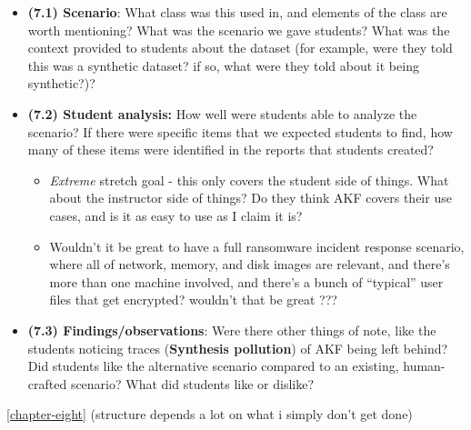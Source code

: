 \begin{itemize}
\tightlist
\item
  \textbf{(7.1) Scenario}: What class was this used in, and elements of
  the class are worth mentioning? What was the scenario we gave
  students? What was the context provided to students about the dataset
  (for example, were they told this was a synthetic dataset? if so, what
  were they told about it being synthetic?)?
\item
  \textbf{(7.2) Student analysis:} How well were students able to
  analyze the scenario? If there were specific items that we expected
  students to find, how many of these items were identified in the
  reports that students created?

  \begin{itemize}
  \tightlist
  \item
    \emph{Extreme} stretch goal - this only covers the student side of
    things. What about the instructor side of things? Do they think AKF
    covers their use cases, and is it as easy to use as I claim it is?
  \item
    Wouldn't it be great to have a full ransomware incident response
    scenario, where all of network, memory, and disk images are
    relevant, and there's more than one machine involved, and there's a
    bunch of ``typical'' user files that get encrypted? wouldn't that be
    great ???
  \end{itemize}
\item
  \textbf{(7.3) Findings/observations}: Were there other things of note,
  like the students noticing traces (\textbf{Synthesis pollution}) of
  AKF being left behind? Did students like the alternative scenario
  compared to an existing, human-crafted scenario? What did students
  like or dislike?
\end{itemize}

\autoref{chapter-eight} (structure depends a lot on what i simply
don't get done)

